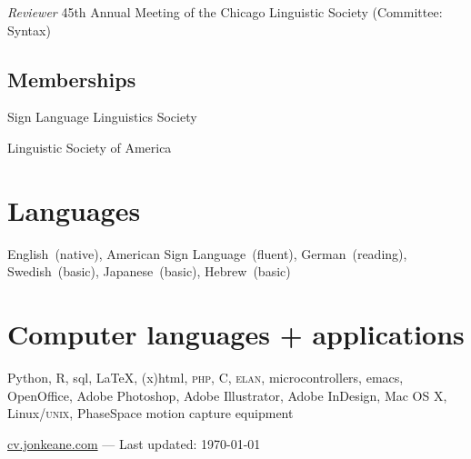 \documentclass[10pt, letterpaper]{article}
\newcommand{\years}[1]{\marginpar{\scriptsize #1}}
\begin{document}
\-\years{2009}\textit{Reviewer} 45th Annual Meeting of the Chicago Linguistic Society (Committee: Syntax)

\subsection*{Memberships}
\label{sec:memberships}
\-\years{2013--}Sign Language Linguistics Society

\-\years{2008--}Linguistic Society of America

\section*{Languages}
\label{sec:languages}
English~(native), American Sign Language~(fluent), German~(reading), Swedish~(basic), Japanese~(basic), Hebrew~(basic)

\section*{Computer languages + applications}
\label{sec:computer}
Python, R, {\sc sql}, \LaTeX, {\sc (x)html}, \textsc{php}, C, \textsc{elan}, microcontrollers, emacs, OpenOffice, Adobe Photoshop, Adobe Illustrator, Adobe InDesign, Mac OS X, Linux/\textsc{unix}, PhaseSpace motion capture equipment

\vfill{}
\hrulefill
\begin{center}
{\footnotesize \href{http://cv.jonkeane.com}{cv.jonkeane.com} — Last updated: \isodate\today}
\end{center}
\end{document}
